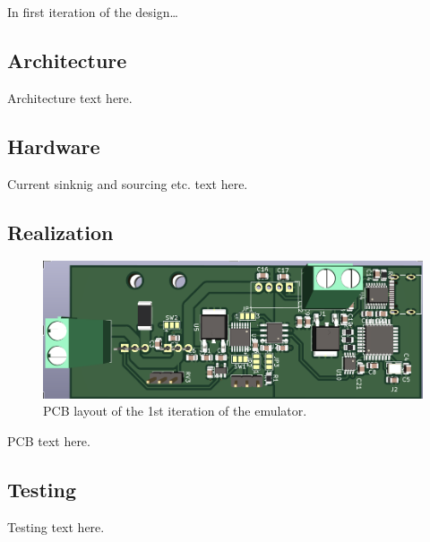 
\IEEEPARstart
{I}{n} first iteration of the design\dots

\subsection{Architecture}
Architecture text here.
\subsection{Hardware}
Current sinknig and sourcing etc. text here.
\subsection{Realization}
    \begin{figure}[h]
        \centering
        \includegraphics[scale=0.45]{pcb_1st_iteration.png}
        \caption{PCB layout of the 1st iteration of the emulator.}
    \end{figure}


PCB text here.
\subsection{Testing}
Testing text here.